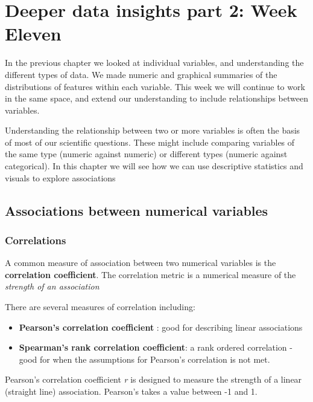 \documentclass[
]{book}
\begin{document}
\hypertarget{deeper-data-insights-part-2-week-eleven}{%
\chapter{Deeper data insights part 2: Week Eleven}\label{deeper-data-insights-part-2-week-eleven}}

In the previous chapter we looked at individual variables, and understanding the different types of data. We made numeric and graphical summaries of the distributions of features within each variable. This week we will continue to work in the same space, and extend our understanding to include relationships between variables.

Understanding the relationship between two or more variables is often the basis of most of our scientific questions. These might include comparing variables of the same type (numeric against numeric) or different types (numeric against categorical). In this chapter we will see how we can use descriptive statistics and visuals to explore associations

\hypertarget{associations-between-numerical-variables}{%
\section{Associations between numerical variables}\label{associations-between-numerical-variables}}

\hypertarget{correlations}{%
\subsection{Correlations}\label{correlations}}

A common measure of association between two numerical variables is the \textbf{correlation coefficient}. The correlation metric is a numerical measure of the \emph{strength of an association}

There are several measures of correlation including:

\begin{itemize}
\item
  \textbf{Pearson's correlation coefficient} : good for describing linear associations
\item
  \textbf{Spearman's rank correlation coefficient}: a rank ordered correlation - good for when the assumptions for Pearson's correlation is not met.
\end{itemize}

Pearson's correlation coefficient \emph{r} is designed to measure the strength of a linear (straight line) association. Pearson's takes a value between -1 and 1.
\end{document}
